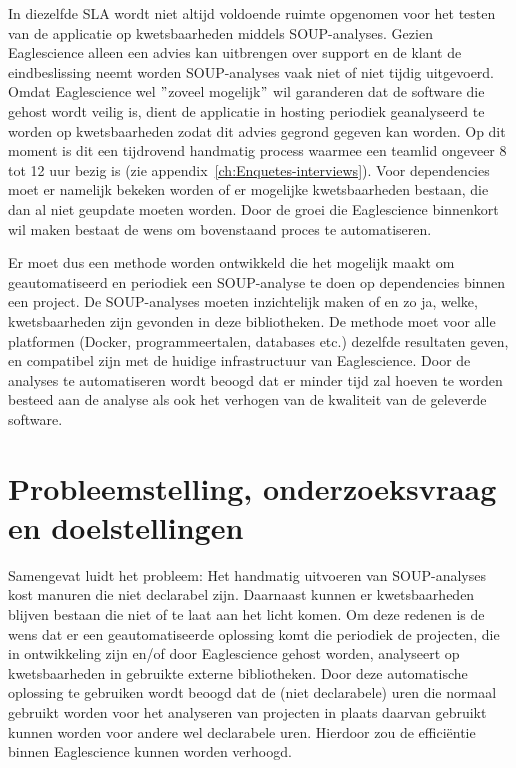 In diezelfde SLA wordt niet altijd voldoende ruimte opgenomen voor het testen van de applicatie op kwetsbaarheden middels SOUP-analyses. Gezien Eaglescience alleen een advies kan uitbrengen over support en de klant de eindbeslissing neemt worden SOUP-analyses vaak niet of niet tijdig uitgevoerd. Omdat Eaglescience wel $"$zoveel mogelijk$"$ wil garanderen dat de software die gehost wordt veilig is, dient de applicatie in hosting periodiek geanalyseerd te worden op kwetsbaarheden zodat dit advies gegrond gegeven kan worden. Op dit moment is dit een tijdrovend handmatig process waarmee een teamlid ongeveer 8 tot 12 uur bezig is (zie appendix~\ref{ch:Enquetes-interviews}). Voor dependencies moet er namelijk bekeken worden of er mogelijke kwetsbaarheden bestaan, die dan al niet geupdate moeten worden. Door de groei die Eaglescience binnenkort wil maken bestaat de wens om bovenstaand proces te automatiseren.

Er moet dus een methode worden ontwikkeld die het mogelijk maakt om geautomatiseerd en periodiek een SOUP-analyse te doen op dependencies binnen een project. De SOUP-analyses moeten inzichtelijk maken of en zo ja, welke, kwetsbaarheden zijn gevonden in deze bibliotheken. De methode moet voor alle platformen (Docker, programmeertalen, databases etc.) dezelfde resultaten geven, en compatibel zijn met de huidige infrastructuur van Eaglescience. Door de analyses te automatiseren wordt beoogd dat er minder tijd zal hoeven te worden besteed aan de analyse als ook het verhogen van de kwaliteit van de geleverde software.

\section{Probleemstelling, onderzoeksvraag en doelstellingen}\label{sec:probleem-stelling-onderzoeksvraag-en-doelstellingen}
Samengevat luidt het probleem: Het handmatig uitvoeren van SOUP-analyses kost manuren die niet declarabel zijn. Daarnaast kunnen er kwetsbaarheden blijven bestaan die niet of te laat aan het licht komen. Om deze redenen is de wens dat er een geautomatiseerde oplossing komt die periodiek de projecten, die in ontwikkeling zijn en/of door Eaglescience gehost worden, analyseert op kwetsbaarheden in gebruikte externe bibliotheken. Door deze automatische oplossing te gebruiken wordt beoogd dat de (niet declarabele) uren die normaal gebruikt worden voor het analyseren van projecten in plaats daarvan gebruikt kunnen worden voor andere wel declarabele uren. Hierdoor zou de efficiëntie binnen Eaglescience kunnen worden verhoogd.

